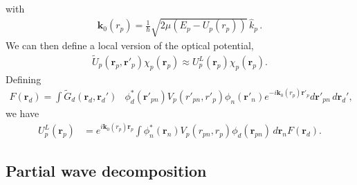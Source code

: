 \documentclass[a4paper,11pt]{article}
\begin{document}
with 
\begin{align}\label{eq29}
\mathbf k_0(r_p)=\frac{1}{\hbar}\sqrt{2\mu\left(E_p-U_p(r_p)\right)}\,\hat k_p\,.
\end{align}
We can then define a local version of the optical potential,
\begin{align}\label{eq31}
\widetilde U_p(\mathbf r_p,\mathbf r'_p)\chi_p(\mathbf r_p)\approx U^L_p(\mathbf r_p)\chi_p(\mathbf r_p).
\end{align}
Defining 
\begin{align}\label{eq71}
F(\mathbf r_d)=\int \widetilde G_d(\mathbf r_d,\mathbf r_d')&\phi_d^*(\mathbf r'_{pn})V_p(r'_{pn},r'_p)\phi_n(\mathbf r'_n)e^{-i\mathbf k_0(r_p)\mathbf r'_p}d\mathbf r'_{pn}\,  d\mathbf r_d',
\end{align}
we have
 \begin{align}\label{eq32}
 U^L_p(\mathbf r_p) &= e^{i\mathbf k_0(r_p)\mathbf r_p}\int  \phi_n^*(\mathbf r_n)V_p(r_{pn},r_p)\phi_d(\mathbf r_{pn})\,d\mathbf r_nF(\mathbf r_d).
 \end{align}
\subsection{Partial wave decomposition}
\end{document}
